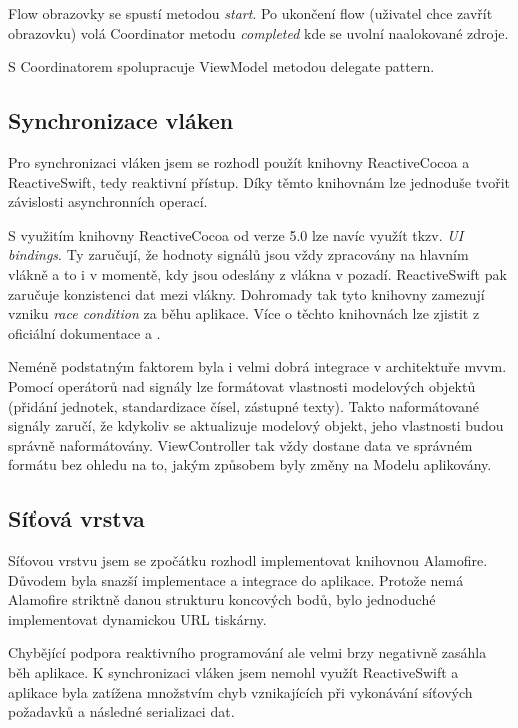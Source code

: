 Flow obrazovky se spustí metodou \textit{start}.
Po ukončení flow (uživatel chce zavřít obrazovku) volá Coordinator metodu \textit{completed} kde se uvolní naalokované zdroje.

S Coordinatorem spolupracuje ViewModel metodou delegate pattern.

\subsection{Synchronizace vláken}

Pro synchronizaci vláken jsem se rozhodl použít knihovny ReactiveCocoa a ReactiveSwift, tedy reaktivní přístup.
Díky těmto knihovnám lze jednoduše tvořit závislosti asynchronních operací.

S využitím knihovny ReactiveCocoa od verze 5.0 lze navíc využít tkzv. \textit{UI bindings}.
Ty zaručují, že hodnoty signálů jsou vždy zpracovány na hlavním vlákně a to i v momentě, kdy jsou odeslány z vlákna v pozadí.
ReactiveSwift pak zaručuje konzistenci dat mezi vlákny.
Dohromady tak tyto knihovny zamezují vzniku \textit{race condition} za běhu aplikace.
Více o těchto knihovnách lze zjistit z oficiální dokumentace \cite{github-reactiveswift} a \cite{github-reactivecocoa}.

Neméně podstatným faktorem byla i velmi dobrá integrace v architektuře \acrshort{mvvm}.
Pomocí operátorů nad signály lze formátovat vlastnosti modelových objektů (přidání jednotek, standardizace čísel, zástupné texty).
Takto naformátované signály zaručí, že kdykoliv se aktualizuje modelový objekt, jeho vlastnosti budou správně naformátovány.
ViewController tak vždy dostane data ve správném formátu bez ohledu na to, jakým způsobem byly změny na Modelu aplikovány.

\subsection{Síťová vrstva}

Síťovou vrstvu jsem se zpočátku rozhodl implementovat knihovnou Alamofire.
Důvodem byla snazší implementace a integrace do aplikace.
Protože nemá Alamofire striktně danou strukturu koncových bodů, bylo jednoduché implementovat dynamickou URL tiskárny.

Chybějící podpora reaktivního programování ale velmi brzy negativně zasáhla běh aplikace.
K synchronizaci vláken jsem nemohl využít ReactiveSwift a aplikace byla zatížena množstvím chyb vznikajících při vykonávání síťových požadavků a následné serializaci dat.

